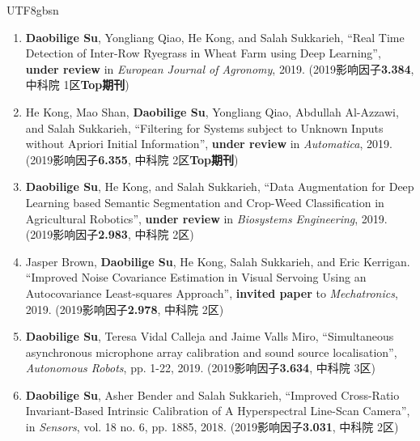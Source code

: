 \documentclass[margin,line]{res}
\begin{document}
\begin{CJK*}{UTF8}{gbsn}
\begin{resume}
\begin{enumerate}

\item \textbf{Daobilige Su}, Yongliang Qiao, He Kong, and Salah Sukkarieh, ``Real Time Detection of Inter-Row Ryegrass in Wheat Farm using Deep Learning'', \textbf{under review} in \textit{European Journal of Agronomy}, 2019. (2019影响因子\textbf{3.384}, 中科院 1区\textbf{Top期刊})

\item He Kong, Mao Shan, \textbf{Daobilige Su}, Yongliang Qiao, Abdullah Al-Azzawi, and Salah Sukkarieh, ``Filtering for Systems subject to Unknown Inputs without Apriori Initial Information'', \textbf{under review} in \textit{Automatica}, 2019. (2019影响因子\textbf{6.355}, 中科院 2区\textbf{Top期刊})

\item \textbf{Daobilige Su}, He Kong, and Salah Sukkarieh, ``Data Augmentation for Deep Learning based Semantic Segmentation and Crop-Weed Classification in Agricultural Robotics'', \textbf{under review} in \textit{Biosystems Engineering}, 2019. (2019影响因子\textbf{2.983}, 中科院 2区)

\item Jasper Brown, \textbf{Daobilige Su}, He Kong, Salah Sukkarieh, and Eric Kerrigan. ``Improved Noise Covariance Estimation in Visual Servoing Using an Autocovariance Least-squares Approach'', \textbf{invited paper} to \textit{Mechatronics}, 2019. (2019影响因子\textbf{2.978}, 中科院 2区)

\item {\bf Daobilige Su}, Teresa Vidal Calleja and Jaime Valls Miro, ``Simultaneous asynchronous microphone array calibration and sound source localisation'', {\it Autonomous Robots}, pp. 1-22, 2019. (2019影响因子\textbf{3.634}, 中科院 3区)


\item {\bf Daobilige Su}, Asher Bender and Salah Sukkarieh, ``Improved Cross-Ratio Invariant-Based Intrinsic Calibration of A Hyperspectral Line-Scan Camera'', in {\it Sensors}, vol. 18 no. 6, pp. 1885, 2018. (2019影响因子\textbf{3.031}, 中科院 2区)


\end{enumerate}
\end{resume}
\end{CJK*}
\end{document}

